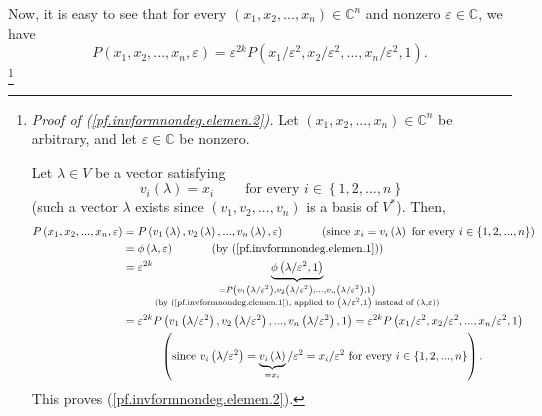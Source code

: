 \documentclass
[numbers=enddot,12pt,final,onecolumn,german,notitlepage]{scrartcl}%
\theoremstyle{definition}
\begin{document}
Now, it is easy to see that for every $\left(  x_{1},x_{2},...,x_{n}\right)
\in\mathbb{C}^{n}$ and nonzero $\varepsilon\in\mathbb{C}$, we have
\begin{equation}
P\left(  x_{1},x_{2},...,x_{n},\varepsilon\right)  =\varepsilon^{2k}P\left(
x_{1}/\varepsilon^{2},x_{2}/\varepsilon^{2},...,x_{n}/\varepsilon
^{2},1\right)  . \label{pf.invformnondeg.elemen.2}%
\end{equation}
\footnote{\textit{Proof of (\ref{pf.invformnondeg.elemen.2}).} Let $\left(
x_{1},x_{2},...,x_{n}\right)  \in\mathbb{C}^{n}$ be arbitrary, and let
$\varepsilon\in\mathbb{C}$ be nonzero.
\par
Let $\lambda\in V$ be a vector satisfying%
\[
v_{i}\left(  \lambda\right)  =x_{i}\ \ \ \ \ \ \ \ \ \ \text{for every }%
i\in\left\{  1,2,...,n\right\}
\]
(such a vector $\lambda$ exists since $\left(  v_{1},v_{2},...,v_{n}\right)  $
is a basis of $V^{\ast}$). Then,%
\begin{align*}
P\left(  x_{1},x_{2},...,x_{n},\varepsilon\right)   &  =P\left(  v_{1}\left(
\lambda\right)  ,v_{2}\left(  \lambda\right)  ,...,v_{n}\left(  \lambda
\right)  ,\varepsilon\right)  \ \ \ \ \ \ \ \ \ \ \left(  \text{since }%
x_{i}=v_{i}\left(  \lambda\right)  \text{ for every }i\in\left\{
1,2,...,n\right\}  \right) \\
&  =\phi\left(  \lambda,\varepsilon\right)  \ \ \ \ \ \ \ \ \ \ \left(
\text{by (\ref{pf.invformnondeg.elemen.1})}\right) \\
&  =\varepsilon^{2k}\underbrace{\phi\left(  \lambda/\varepsilon^{2},1\right)
}_{\substack{=P\left(  v_{1}\left(  \lambda/\varepsilon^{2}\right)
,v_{2}\left(  \lambda/\varepsilon^{2}\right)  ,...,v_{n}\left(  \lambda
/\varepsilon^{2}\right)  ,1\right)  \\\text{(by
(\ref{pf.invformnondeg.elemen.1}), applied to }\left(  \lambda/\varepsilon
^{2},1\right)  \text{ instead of }\left(  \lambda,\varepsilon\right)
\text{)}}}\\
&  =\varepsilon^{2k}P\left(  v_{1}\left(  \lambda/\varepsilon^{2}\right)
,v_{2}\left(  \lambda/\varepsilon^{2}\right)  ,...,v_{n}\left(  \lambda
/\varepsilon^{2}\right)  ,1\right)  =\varepsilon^{2k}P\left(  x_{1}%
/\varepsilon^{2},x_{2}/\varepsilon^{2},...,x_{n}/\varepsilon^{2},1\right) \\
&  \ \ \ \ \ \ \ \ \ \ \left(  \text{since }v_{i}\left(  \lambda
/\varepsilon^{2}\right)  =\underbrace{v_{i}\left(  \lambda\right)  }_{=x_{i}%
}/\varepsilon^{2}=x_{i}/\varepsilon^{2}\text{ for every }i\in\left\{
1,2,...,n\right\}  \right)  .
\end{align*}
This proves (\ref{pf.invformnondeg.elemen.2}).}
\end{document}
